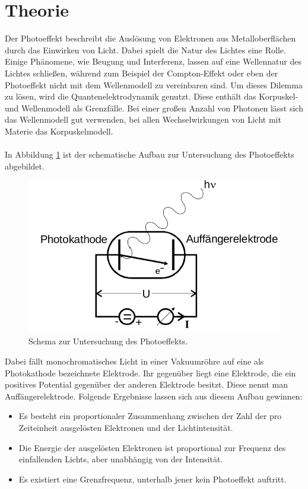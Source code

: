 \maketitle
\setcounter{page}{1}
\tableofcontents
\newpage
{}
\section{Theorie}
Der Photoeffekt beschreibt die Auslösung von Elektronen aus Metalloberflächen
durch das Einwirken von Licht. Dabei spielt die Natur des Lichtes eine Rolle.
Einige Phänomene, wie Beugung und Interferenz, lassen auf eine Wellennatur
des Lichtes schließen, während zum Beispiel der Compton-Effekt oder eben der
Photoeffekt nicht mit dem Wellenmodell zu vereinbaren sind. Um dieses Dilemma zu lösen,
wird die Quantenelektrodynamik genutzt. Diese enthält das Korpuskel- und Wellenmodell
als Grenzfälle. Bei einer großen Anzahl von Photonen lässt sich das Wellenmodell gut verwenden,
bei allen Wechselwirkungen von Licht mit Materie das Korpuskelmodell. \\
\\
In Abbildung \ref{fig:1} ist der schematische Aufbau zur Untersuchung des Photoeffekts abgebildet.
\begin{figure}[h]
  \centering
  \includegraphics[scale=0.4]{aufbautheorie.png}
  \caption{Schema zur Untersuchung des Photoeffekts.}
  \label{fig:1}
\end{figure}
Dabei fällt monochromatisches Licht in einer Vakuumröhre auf eine als Photokathode bezeichnete Elektrode.
Ihr gegenüber liegt eine Elektrode, die ein positives Potential gegenüber der anderen Elektrode besitzt.
Diese nennt man Auffängerelektrode. Folgende Ergebnisse lassen sich aus diesem Aufbau gewinnen:
\begin{itemize}
  \item Es besteht ein proportionaler Zusammenhang zwischen der Zahl der pro Zeiteinheit ausgelösten
  Elektronen und der Lichtintensität.
  \item Die Energie der ausgelösten Elektronen ist proportional zur Frequenz des einfallenden
  Lichts, aber unabhängig von der Intensität.
  \item Es existiert eine Grenzfrequenz, unterhalb jener kein Photoeffekt auftritt.
\end{itemize}
